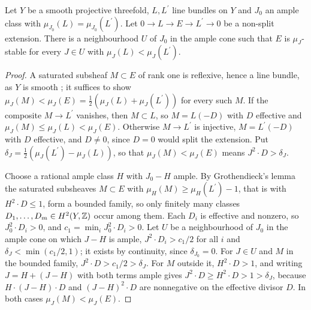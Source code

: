 \begin{lemma}\label{lem:wall}
Let $Y$ be a smooth projective threefold, $L,L^\prime$ line bundles on $Y$
and $J_0$ an ample class with $\mu_{J_0}(L)=\mu_{J_0}(L^\prime)$. Let
$0\to L\to E\to L^\prime\to0$ be a non-split extension. There is a
neighbourhood $U$ of $J_0$ in the ample cone such that $E$ is
$\mu_J$-stable for every $J\in U$ with $\mu_J(L)<\mu_J(L^\prime)$.
\end{lemma}
\begin{proof}
A saturated subsheaf $M\subset E$ of rank one is reflexive, hence a line
bundle, as $Y$ is smooth \cite[Section~1.1]{HL10}; it suffices to
show $\mu_J(M)<\mu_J(E)=\frac12(\mu_J(L)+\mu_J(L^\prime))$ for every
such $M$. If the composite $M\to L^\prime$ vanishes, then $M\subset L$,
so $M=L(-D)$ with $D$ effective and $\mu_J(M)\le\mu_J(L)<\mu_J(E)$.
Otherwise $M\to L^\prime$ is injective, $M=L^\prime(-D)$ with $D$
effective, and $D\ne0$, since $D=0$ would split the extension. Put
$\delta_J=\frac12(\mu_J(L^\prime)-\mu_J(L))$, so that
$\mu_J(M)<\mu_J(E)$ means $J^2\cdot D>\delta_J$.

Choose a rational ample class $H$ with $J_0-H$ ample. By Grothendieck's
lemma \cite[Lemma~1.7.9]{HL10} the saturated subsheaves $M\subset E$ with
$\mu_H(M)\ge\mu_H(L^\prime)-1$, that is with $H^2\cdot D\le1$, form a
bounded family, so only finitely many classes $D_1,\dots,D_m\in H^2(Y,\mathbb{Z})$
occur among them. Each $D_i$ is effective and nonzero, so
$J_0^2\cdot D_i>0$, and $c_1=\min_iJ_0^2\cdot D_i>0$. Let $U$ be a
neighbourhood of $J_0$ in the ample cone on which $J-H$ is ample,
$J^2\cdot D_i>c_1/2$ for all $i$ and $\delta_J<\min(c_1/2,1)$; it exists
by continuity, since $\delta_{J_0}=0$. For $J\in U$ and $M$ in the bounded
family, $J^2\cdot D>c_1/2>\delta_J$. For $M$ outside it, $H^2\cdot D>1$,
and writing $J=H+(J-H)$ with both terms ample gives
$J^2\cdot D\ge H^2\cdot D>1>\delta_J$, because
$H\cdot(J-H)\cdot D$ and $(J-H)^2\cdot D$ are nonnegative on the
effective divisor $D$. In both cases $\mu_J(M)<\mu_J(E)$.
\end{proof}

